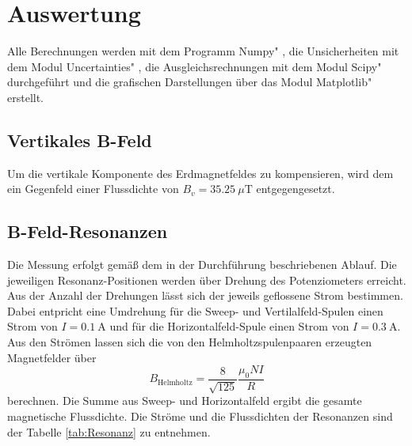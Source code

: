 \section{Auswertung}
\label{sec:Auswertung}
Alle Berechnungen werden mit dem Programm \glqq Numpy" \cite{numpy}, die Unsicherheiten mit dem Modul \glqq Uncertainties" \cite{uncertainties}, die Ausgleichsrechnungen mit dem Modul \glqq Scipy" \cite{scipy} durchgeführt und die grafischen Darstellungen über das Modul \glqq Matplotlib" \cite{matplotlib} erstellt.



\subsection{Vertikales B-Feld}

Um die vertikale Komponente des Erdmagnetfeldes zu kompensieren, wird dem ein Gegenfeld einer Flussdichte von $B_v=\SI{35.25}{\mu\tesla}$ entgegengesetzt.


\subsection{B-Feld-Resonanzen}
Die Messung erfolgt gemäß dem in der Durchführung beschriebenen Ablauf. Die jeweiligen Resonanz-Positionen werden über Drehung des Potenziometers erreicht. 
Aus der Anzahl der Drehungen lässt sich der jeweils geflossene Strom bestimmen. 
Dabei entpricht eine Umdrehung für die Sweep- und Vertilalfeld-Spulen einen Strom von $I=\SI{0.1}{\ampere}$ und für die Horizontalfeld-Spule einen Strom von $I=\SI{0.3}{\ampere}$. 
Aus den Strömen lassen sich die von den Helmholtzspulenpaaren erzeugten Magnetfelder über
\begin{equation}
    B_{\text{Helmholtz}} = \frac{8}{\sqrt{125}}\frac{\mu_0 N I}{R}
\end{equation}
berechnen. Die Summe aus Sweep- und Horizontalfeld ergibt die gesamte magnetische Flussdichte.
Die Ströme und die Flussdichten der Resonanzen sind der Tabelle \ref{tab:Resonanz} zu entnehmen. 

